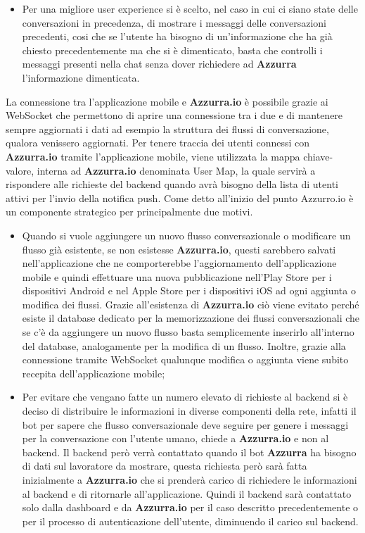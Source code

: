 \begin{trivlist}
\begin{itemize}
		\item Per una migliore user experience si è scelto, nel caso in cui ci siano state delle conversazioni in precedenza, di mostrare i messaggi delle conversazioni precedenti, cosi che se l'utente ha bisogno di un’informazione  che ha già chiesto precedentemente ma che si è dimenticato, basta che controlli i messaggi presenti nella chat senza dover richiedere ad \textbf{Azzurra} l'informazione dimenticata.
	\end{itemize}
	La connessione tra l'applicazione mobile e \textbf{Azzurra.io} è possibile grazie ai WebSocket che permettono di aprire una connessione tra i due e di mantenere sempre aggiornati i dati ad esempio la struttura dei flussi di conversazione, qualora venissero aggiornati. Per tenere traccia dei utenti connessi con \textbf{Azzurra.io} tramite l'applicazione mobile, viene utilizzata la mappa chiave-valore, interna ad \textbf{Azzurra.io} denominata User Map, la quale servirà a rispondere alle richieste del backend quando avrà bisogno della lista di utenti attivi per l'invio della notifica push. Come detto all'inizio del punto Azzurro.io è un componente strategico per principalmente due motivi.
	\begin{itemize}
		\item Quando si vuole aggiungere un nuovo flusso conversazionale o modificare un flusso già esistente, se non esistesse \textbf{Azzurra.io}, questi sarebbero salvati nell'applicazione che ne comporterebbe l'aggiornamento dell'applicazione mobile e quindi effettuare una nuova pubblicazione nell'Play Store per i dispositivi Android e nel Apple Store per i dispositivi iOS ad ogni aggiunta o modifica dei flussi. Grazie all'esistenza di \textbf{Azzurra.io} ciò viene evitato perché esiste il database dedicato per la memorizzazione dei flussi conversazionali che se c'è da aggiungere un nuovo flusso basta semplicemente inserirlo all'interno del database, analogamente per la modifica di un flusso. Inoltre, grazie alla connessione tramite WebSocket qualunque modifica o aggiunta viene subito recepita dell'applicazione mobile;
		\item Per evitare che vengano fatte un numero elevato di richieste al backend si è deciso di distribuire le informazioni in diverse componenti della rete, infatti il bot per sapere che flusso conversazionale deve seguire per genere i messaggi per la conversazione con l'utente umano, chiede a \textbf{Azzurra.io} e non al backend. Il backend però verrà contattato quando il bot \textbf{Azzurra} ha bisogno di dati sul lavoratore da mostrare, questa richiesta però sarà fatta inizialmente a \textbf{Azzurra.io} che si prenderà carico di richiedere le informazioni al backend e di ritornarle all'applicazione. Quindi il backend sarà contattato solo dalla dashboard e da \textbf{Azzurra.io} per il caso descritto precedentemente o per il processo di autenticazione dell'utente, diminuendo il carico sul backend.
	\end{itemize}
	

\end{trivlist}
